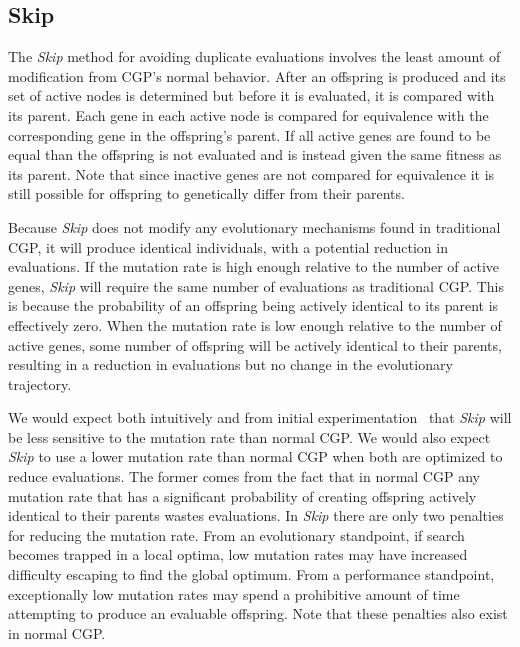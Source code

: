 \documentclass[journal]{IEEEtran}
\begin{document}
\subsection{Skip}
The \emph{Skip} method for avoiding duplicate evaluations involves the least
amount of modification from CGP's normal behavior.  After an offspring is produced
and its set of active nodes is determined but before it is evaluated, it is compared
with its parent.  Each gene in each active node is compared for equivalence with
the corresponding gene in the offspring's parent.  If all active genes are found to be equal
than the offspring is not evaluated and is instead given the same fitness
as its parent.
Note that since inactive genes are not compared for equivalence it is still possible
for offspring to genetically differ from their parents.

Because \emph{Skip} does not modify any evolutionary mechanisms found in traditional CGP,
it will produce identical individuals, with a potential reduction in evaluations.
If the mutation rate is high enough relative
to the number of active genes, \emph{Skip} will require the same number of evaluations as traditional CGP. This is because
the probability of an offspring being actively identical to its parent is effectively zero.
When the mutation rate is low enough relative to the number of active genes, some number of
offspring will be actively identical to their parents, resulting in a reduction in evaluations
but no change in the evolutionary trajectory.

We would expect both intuitively and from initial
experimentation~\cite{goldman:2013:cgpwaste} that \emph{Skip} will be less sensitive
to the mutation rate than normal CGP.  We would also expect \emph{Skip} to use a lower
mutation rate than normal CGP when both are optimized to reduce evaluations.
The former comes from the fact that in normal CGP any mutation rate that has a significant
probability of creating offspring actively identical to their parents wastes
evaluations.  In \emph{Skip} there are only two penalties for reducing the
mutation rate.  From an evolutionary standpoint, if search becomes trapped in a local optima, low mutation
rates may have increased difficulty escaping to find the global optimum.  From a performance standpoint,
exceptionally low mutation rates may spend a prohibitive amount of time
attempting to produce an evaluable offspring.
Note that these penalties also exist in normal CGP.
\end{document}
